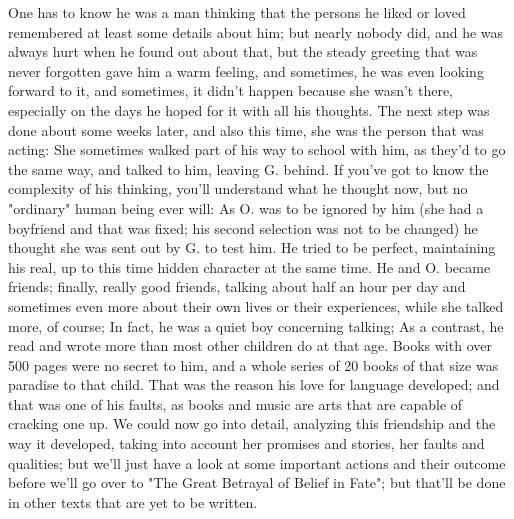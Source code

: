 One has to know he was a man thinking that the persons he liked or loved remembered at least some details about him; but nearly nobody did, and he was always hurt when he found out about that, but the steady greeting that was never forgotten gave him a warm feeling, and sometimes, he was even looking forward to it, and sometimes, it didn't happen because she wasn't there, especially on the days he hoped for it with all his thoughts. The next step was done about some weeks later, and also this time, she was the person that was acting: She sometimes walked part of his way to school with him, as they'd to go the same way, and talked to him, leaving G. behind. If you've got to know the complexity of his thinking, you'll understand what he thought now, but no "ordinary" human being ever will: As O. was to be ignored by him (she had a boyfriend and that was fixed; his second selection was not to be changed) he thought she was sent out by G. to test him. He tried to be perfect, maintaining his real, up to this time hidden character at the same time. He and O. became friends; finally, really good friends, talking about half an hour per day and sometimes even more about their own lives or their experiences, while she talked more, of course; In fact, he was a quiet boy concerning talking; As a contrast, he read and wrote more than most other children do at that age. Books with over 500 pages were no secret to him, and a whole series of 20 books of that size was paradise to that child. That was the reason his love for language developed; and that was one of his faults, as books and music are arts that are capable of cracking one up. 
We could now go into detail, analyzing this friendship and the way it developed, taking into account her promises and stories, her faults and qualities; but we'll just have a look at some important actions and their outcome before we'll go over to "The Great Betrayal of Belief in Fate"; but that'll be done in other texts that are yet to be written. 
